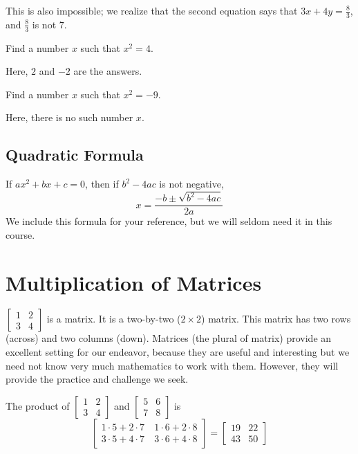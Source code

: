\documentclass{article}
\begin{document}
\begin{description}
    This is also impossible; we realize that the second equation says that $3x + 4y = \frac{8}{3}$, and $\frac{8}{3}$ is not $7$.

  \item[Sample Problem 8:] Find a number $x$ such that $x^2 = 4$. 

    Here, $2$ and $-2$ are the answers.

  \item[Sample Problem 9:] Find a number $x$ such that $x^2 = -9$. 

    Here, there is no such number $x$.

\end{description}


\subsection{Quadratic Formula}

If $ax^2 + bx + c = 0$, then if $b^2 - 4ac$ is not negative,
\begin{equation*}
x = \frac{ -b \pm \sqrt{b^2 - 4ac} }{2a}
\end{equation*}
We include this formula for your reference, but we will seldom need it in this course.




\newpage

\section{Multiplication of Matrices} 

$\begin{bmatrix} 1 & 2 \\ 3 & 4 \end{bmatrix}$ is a matrix. It is a two-by-two ($2 \times 2$) matrix. This matrix has two rows (across) and two columns (down). Matrices (the plural of matrix) provide an excellent setting for our endeavor, because they are useful and interesting but we need not know very much mathematics to work with them. However, they will provide the practice and challenge we seek.

The product of $\begin{bmatrix} 1 & 2 \\ 3 &4 \end{bmatrix}$ and $\begin{bmatrix} 5 & 6 \\ 7 & 8 \end{bmatrix}$ is
\begin{equation*}
\begin{bmatrix} 
  1 \cdot 5+2 \cdot 7 & \ 1 \cdot 6+2 \cdot 8 \\ 
  3 \cdot 5+4 \cdot 7 & \ 3 \cdot 6+4 \cdot 8 
\end{bmatrix}
= \begin{bmatrix} 19 & 22 \\ 43 & 50 \end{bmatrix} 
\end{equation*}
\end{document}
